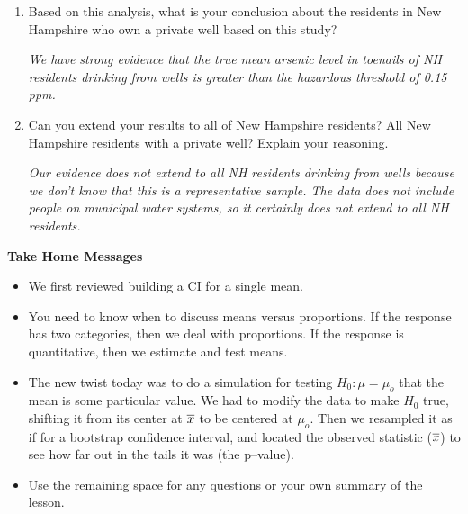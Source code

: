 \begin{enumerate}
\begin{key}
  {\it 0.016*3000 = 48}
\end{key}



{\bf Step 5: Formulate conclusions.}


\item Based on this analysis, what is your conclusion about the
  residents in New Hampshire who own a private well based on this
  study?
\begin{students}
  \vspace{2cm}
\end{students}

\begin{key}
  {\it We have strong evidence that the true mean arsenic level in
    toenails of NH residents drinking from wells is greater than the
    hazardous threshold of 0.15 ppm.} 
\end{key}
\item Can you extend your results to all of New Hampshire residents?
  All New Hampshire residents with a private well?  Explain your
  reasoning.
\begin{students}
  \newpage
\end{students}

\begin{key}
  {\it Our evidence does not extend to all NH residents drinking from
    wells because we don't know that this is a representative sample.
   The data does not include people on municipal water systems, so it
   certainly does not extend to all NH residents.} 
\end{key}

\end{enumerate}

\begin{center}
  {\bf Take Home Messages}\vspace{-.1in}
\end{center}

\begin{itemize}
\item We first reviewed building a CI for a single mean.
\item You need to know when to discuss means versus proportions.  If
  the response has two categories, then we deal with proportions.  If
  the response is quantitative, then we estimate and test means.
\item The new twist today was to do a simulation for testing $H_0: \mu
  = \mu_o$ that the mean is some particular value.  We had to modify
  the data to make $H_0$ true, shifting it from its center at $\overline{x}$ to
  be centered at $\mu_o$.  Then we resampled it as if for a bootstrap
  confidence interval, and located the observed statistic ($\overline{x}$) to
  see how far out in the tails it was (the p--value).

 \item 
  Use the remaining space for any questions or your own summary of the
  lesson. 

\end{itemize}
